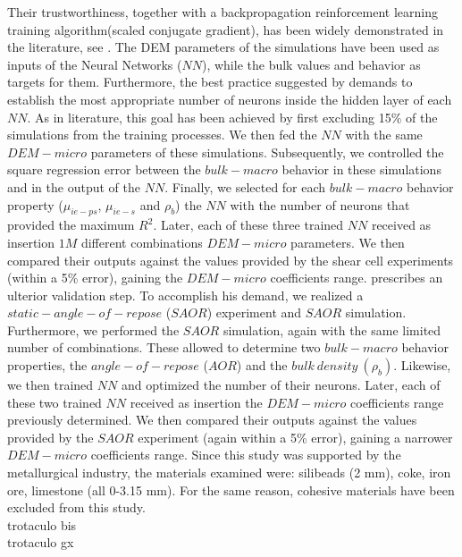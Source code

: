 Their trustworthiness, together with a backpropagation reinforcement learning training algorithm(scaled conjugate gradient), has been widely demonstrated in the literature, see \citet{RefWorks:158}.
The DEM parameters of the simulations have been used as inputs of the Neural Networks ($NN$), while the bulk values and behavior as targets for them.
Furthermore, the best practice suggested by \citet{RefWorks:150} demands to establish the most appropriate number of neurons inside the hidden layer of each $NN$.
As in literature, this goal has been achieved by first excluding 15\% of the simulations from the training processes.
We then fed the $NN$ with the same $DEM-micro$ parameters of these simulations.
Subsequently, we controlled the square regression error between the $bulk-macro$ behavior in these simulations and in the output of the $NN$.
Finally, we selected for each $bulk-macro$ behavior property ($\mu_{ie-ps}$, $\mu_{ie-s}$ and $\rho_b$) the $NN$ with the number of neurons that provided the maximum $R^2$.
Later, each of these three trained $NN$ received as insertion $1M$ different combinations $DEM-micro$ parameters.
We then compared their outputs against the values provided by the shear cell experiments (within a 5\% error), gaining the $DEM-micro$ coefficients range.
\citet{RefWorks:160} prescribes an ulterior validation step.
To accomplish his demand, we realized a $static-angle-of-repose$ ($SAOR$) experiment and $SAOR$ simulation.
Furthermore, we performed the $SAOR$ simulation, again with the same limited number of combinations.
These allowed to determine two $bulk-macro$ behavior properties, the $angle-of-repose$ ($AOR$) and the $bulk ~ density ~ (\rho_b)$.
Likewise, we then trained $NN$ and optimized the number of their neurons.
Later, each of these two trained $NN$ received as insertion the $DEM-micro$ coefficients range previously determined.
We then compared their outputs against the values provided by the $SAOR$ experiment (again within a 5\% error), gaining a narrower $DEM-micro$ coefficients range.
Since this study was supported by the metallurgical industry, the materials examined were: silibeads (2 mm), coke, iron ore, limestone (all 0-3.15 mm).
For the same reason, cohesive materials have been excluded from this study.\\ \label{par:materials}
trotaculo bis \\
trotaculo gx